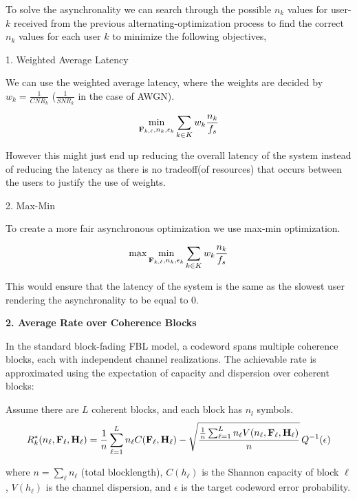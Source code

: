 \documentclass[a4paper, 12pt, onecolumn, journal, twoside, draftclsnofoot]{IEEEtran}
\begin{document}
To solve the asynchronality we can search through the possible $n_k$ values  for user-$k$  received from the previous alternating-optimization process to find the correct $n_k$ values for each user $k$ to minimize the following objectives,


1. Weighted Average Latency 

We can use the weighted average latency, where the weights are decided by $w_k = \frac{1}{CNR_k}$ ($\frac{1}{SNR_k}$ in the case of AWGN).

\begin{equation*}
	\min_{{\bf F}_{k,\ell}, n_{k}, \epsilon_k} \sum_{k \in K} w_k \frac{n_k}{f_s}
\end{equation*}

However this might just end up reducing the overall latency of the system instead of reducing the latency as there is no tradeoff(of resources) that occurs between the users to justify the use of weights.


2. Max-Min


To create a more fair asynchronous optimization we use max-min optimization.

\begin{equation*}
	\max \min_{{\bf F}_{k,\ell}, n_{k}, \epsilon_k} \sum_{k \in K} w_k \frac{n_k}{f_s}
\end{equation*}

This would ensure that the latency of the system is the same as the slowest user rendering the asynchronality to be equal to $0$.

\textbf{2. Average Rate over Coherence Blocks}

In the standard block-fading FBL model, a codeword spans multiple coherence blocks, each with independent channel realizations. The achievable rate is approximated using the expectation of capacity and dispersion over coherent blocks:

Assume there are $L$ coherent blocks, and each block has $n_l$ symbols.
\begin{equation*}
		R^*_k(n_\ell, {\bf F}_\ell, {\bf H}_\ell) = \frac{1}{n} \sum_{\ell=1}^{L} n_\ell C({\bf F}_\ell, {\bf H}_\ell) - 
	\sqrt{\frac{\frac{1}{n} \sum_{\ell=1}^{L} n_\ell V(n_\ell, {\bf F}_\ell, {\bf H}_\ell)}{n}} \, Q^{-1}(\epsilon)
\end{equation*}

where $n = \sum_{\ell} n_\ell$ (total blocklength), $C(h_\ell)$ is the Shannon capacity of block $\ell$, $V(h_\ell)$ is the channel dispersion, and $\epsilon$ is the target codeword error probability.
\end{document}
